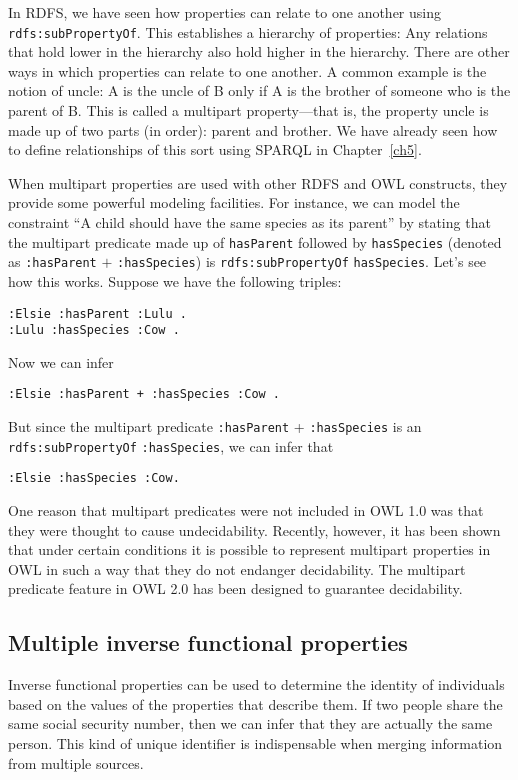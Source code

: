 In RDFS, we have seen how properties can relate to one another using
\texttt{rdfs:subPropertyOf}. This establishes a hierarchy of properties: Any
relations that hold lower in the hierarchy also hold higher in the
hierarchy. There are other ways in which properties can relate to one
another. A common example is the notion of uncle: A is the uncle of B
only if A is the brother of someone who is the parent
of B. This is called a multipart property---that is, the property uncle
is made up of two parts (in order): parent and brother. We have already
seen how to define relationships of this sort using SPARQL in Chapter~\ref{ch5}.

When multipart properties are used with other RDFS and OWL constructs,
they provide some powerful modeling facilities. For instance, we can
model the constraint ``A child should have the same species as its
parent'' by stating that the multipart predicate made up of \texttt{hasParent}
followed by \texttt{hasSpecies} (denoted as \texttt{:hasParent} $+$ \texttt{:hasSpecies}) is
\texttt{rdfs:subPropertyOf} \texttt{hasSpecies}. Let's see how this works. Suppose we have
the following triples:

\begin{lstlisting}
:Elsie :hasParent :Lulu . 
:Lulu :hasSpecies :Cow .
\end{lstlisting}

Now we can infer

\begin{lstlisting}
:Elsie :hasParent + :hasSpecies :Cow .
\end{lstlisting}

But since the multipart predicate \texttt{:hasParent} + \texttt{:hasSpecies} is an
\texttt{rdfs:subPropertyOf}
\texttt{:hasSpecies}, we can infer that

\begin{lstlisting}
:Elsie :hasSpecies :Cow.
\end{lstlisting}

One reason that multipart predicates were not included in OWL 1.0 was
that they were thought to cause undecidability. Recently, however, it
has been shown that under certain conditions it is possible to represent
multipart properties in OWL in such a way that they do not endanger
decidability. The multipart predicate feature in OWL 2.0 has been
designed to guarantee decidability.

\subsection{Multiple inverse functional properties}
\label{mIFP}
Inverse functional properties can be used to determine the identity of
individuals based on the values of the properties that describe them. If
two people share the same social security number, then we can infer that
they are actually the same person. This kind of unique identifier is
indispensable when merging information from multiple sources.


